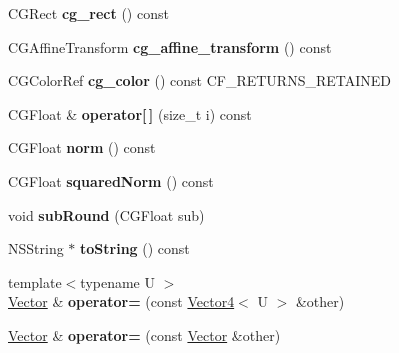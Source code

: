 \begin{DoxyCompactItemize}
C\+G\+Rect {\bfseries cg\+\_\+rect} () const
\item 
\mbox{\label{class_p_o_p_1_1_vector_aaeb39972cf34353199146cadd9fae244}} 
C\+G\+Affine\+Transform {\bfseries cg\+\_\+affine\+\_\+transform} () const
\item 
\mbox{\label{class_p_o_p_1_1_vector_acac9656c405805a0625665a65c6e44da}} 
C\+G\+Color\+Ref {\bfseries cg\+\_\+color} () const C\+F\+\_\+\+R\+E\+T\+U\+R\+N\+S\+\_\+\+R\+E\+T\+A\+I\+N\+ED
\item 
\mbox{\label{class_p_o_p_1_1_vector_a51bd97eaabcb0dd09c862e7ee327fd0d}} 
C\+G\+Float \& {\bfseries operator\mbox{[}$\,$\mbox{]}} (size\+\_\+t i) const
\item 
\mbox{\label{class_p_o_p_1_1_vector_a7e6c41fccd5dd761f8c8ab3e426fbf19}} 
C\+G\+Float {\bfseries norm} () const
\item 
\mbox{\label{class_p_o_p_1_1_vector_a6973ef771e5ef4b96c6c61860a1c6f6d}} 
C\+G\+Float {\bfseries squared\+Norm} () const
\item 
\mbox{\label{class_p_o_p_1_1_vector_ac9bf325f3c217c84d853436ebac0a314}} 
void {\bfseries sub\+Round} (C\+G\+Float sub)
\item 
\mbox{\label{class_p_o_p_1_1_vector_a83ca50340539668cf8fddd75902c0881}} 
N\+S\+String $\ast$ {\bfseries to\+String} () const
\item 
\mbox{\label{class_p_o_p_1_1_vector_a3453193c28aaa1a46b542e9c4735a419}} 
{\footnotesize template$<$typename U $>$ }\\\mbox{\hyperlink{class_p_o_p_1_1_vector}{Vector}} \& {\bfseries operator=} (const \mbox{\hyperlink{struct_p_o_p_1_1_vector4}{Vector4}}$<$ U $>$ \&other)
\item 
\mbox{\label{class_p_o_p_1_1_vector_ac22ab938527612897a1702a91b856f68}} 
\mbox{\hyperlink{class_p_o_p_1_1_vector}{Vector}} \& {\bfseries operator=} (const \mbox{\hyperlink{class_p_o_p_1_1_vector}{Vector}} \&other)
\item 

\end{DoxyCompactItemize}

